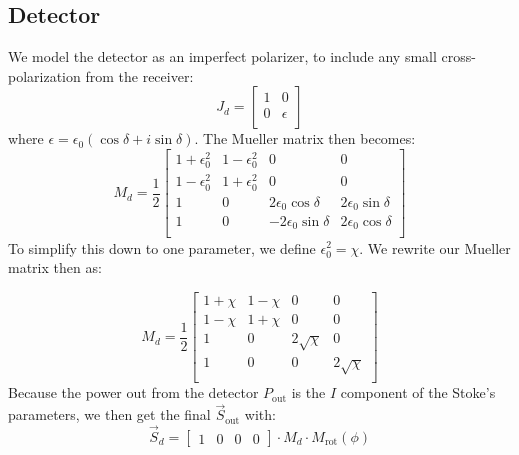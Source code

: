\subsection{Detector}
We model the detector as an imperfect polarizer, to include any small cross-polarization from the receiver:
\begin{equation}
    J_{d} = \begin{bmatrix}
    1 & 0 \\
    0 & \epsilon\\
  \end{bmatrix}
\end{equation}
where $\epsilon = \epsilon_0(\cos\delta + i\sin\delta)$.  The Mueller matrix then becomes:
\begin{equation}
    M_{d} = \frac{1}{2}\begin{bmatrix}
    1+\epsilon_0^2 & 1-\epsilon_0^2 & 0 & 0\\
    1-\epsilon_0^2 & 1+\epsilon_0^2 & 0 & 0\\
    1 & 0 & 2\epsilon_0\cos\delta & 2\epsilon_0\sin\delta\\
    1 & 0 & -2\epsilon_0\sin\delta & 2\epsilon_0\cos\delta\\
  \end{bmatrix}
\end{equation}
To simplify this down to one parameter, we define $\epsilon_0^2 = \chi$.  We rewrite our Mueller matrix then as:

\begin{equation}
    M_{d} = \frac{1}{2}\begin{bmatrix}
    1+\chi & 1-\chi & 0 & 0\\
    1-\chi & 1+\chi & 0 & 0\\
    1 & 0 & 2\sqrt{\chi} & 0\\
    1 & 0 & 0 & 2\sqrt{\chi}\\
  \end{bmatrix}
\end{equation}
Because the power out from the detector $P_{\text{out}}$ is the $I$ component of the Stoke's parameters, we then get the final $\vec{S}_{\text{out}}$ with:
\begin{equation}
    \vec{S}_{d} = \begin{bmatrix}
    1 & 0 & 0 & 0
  \end{bmatrix} \cdot M_{d} \cdot M_{\text{rot}}(\phi)
\end{equation}
